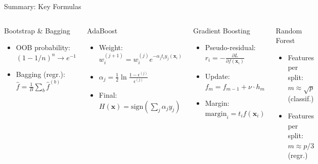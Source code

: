\begin{frame}{Summary: Key Formulas}
  \begin{columns}[t]
      \begin{block}{Bootstrap \& Bagging}
        \begin{itemize}
          \item OOB probability: $(1 - 1/n)^n \to e^{-1}$
          \item Bagging (regr.): $\hat{f} = \frac{1}{B}\sum_b \hat{f}^{(b)}$
        \end{itemize}
      \end{block}
      \vspace{0.4em}
      \begin{block}{AdaBoost}
        \begin{itemize}
          \item Weight: $w_i^{(j+1)} = w_i^{(j)} e^{-\alpha_j t_i y_j(\mathbf{x}_i)}$
          \item $\alpha_j = \frac{1}{2}\ln\frac{1-\epsilon^{(j)}}{\epsilon^{(j)}}$
          \item Final: $H(\mathbf{x}) = \text{sign}(\sum_j \alpha_j y_j)$
        \end{itemize}
      \end{block}
      \begin{block}{Gradient Boosting}
        \begin{itemize}
          \item Pseudo-residual: $r_i = -\frac{\partial L}{\partial f(\mathbf{x}_i)}$
          \item Update: $f_m = f_{m-1} + \nu \cdot h_m$
          \item Margin: $\text{margin}_i = t_i f(\mathbf{x}_i)$
        \end{itemize}
      \end{block}
      \vspace{0.4em}
      \begin{block}{Random Forest}
        \begin{itemize}
          \item Features per split: $m \approx \sqrt{p}$ (classif.)
          \item Features per split: $m \approx p/3$ (regr.)
        \end{itemize}
      \end{block}
  \end{columns}
\end{frame}

